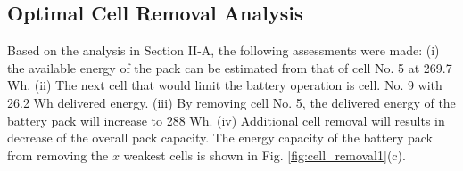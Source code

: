 \documentclass[10pt,twocolumn]{IEEEtran}
\begin{document}
\subsection{Optimal Cell Removal Analysis}


Based on the analysis in Section II-A, the following assessments were made: 
(i) the available energy of the pack can be estimated from that of cell No.  5 at 269.7 Wh.
(ii) The next cell that would limit the battery operation is cell. No. 9 with 26.2 Wh delivered energy.
(iii) By removing  cell No. 5, the  delivered energy of the battery pack will increase  to 288 Wh.
(iv) Additional cell removal will results in decrease of the overall pack capacity.
The energy capacity of the battery pack from removing the $x$ weakest cells is shown in Fig.  \ref{fig:cell_removal1}(c). 


%  
\vspace{-0.3cm}
\end{document}
